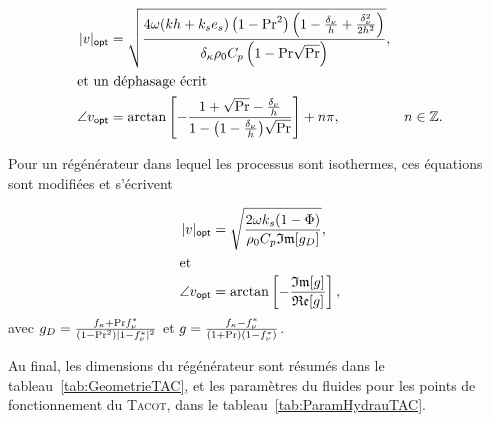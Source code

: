 \begin{subequations}
	\begin{align}
		|v|_{\sf opt} &= \sqrt{\frac{4 \omega (kh+k_se_s) \left(1-\mathrm{Pr}^2\right)\left(1-\frac{\delta_\nu}{h}+\frac{\delta_\nu^2}{2h^2}\right)}{\delta_\kappa \rho_0 C_p \left(1-\mathrm{Pr}\sqrt{\mathrm{Pr}}\right)}}, & 	\label{eq:u_mag_opt_Gaelle}\\
		\intertext{et un déphasage écrit}
		\angle v_{\sf opt} &= \arctan\left[-\frac{1+\sqrt{\mathrm{Pr}}-\frac{\delta_\nu}{h}}{1-\big(1-\frac{\delta_\nu}{h} \big)\sqrt{\mathrm{Pr}}}\right]+n \pi, & n \in \mathbb{Z}.	\label{eq:u_arg_opt_Gaelle}
	\end{align}
	\label{eq:u_opt_Gaelle}
\end{subequations}

Pour un régénérateur dans lequel les processus sont isothermes, ces équations sont modifiées et s'écrivent 

\begin{subequations}
	\begin{align}
		|v|_{\sf opt} &= \sqrt{\frac{2 \omega k_s(1-\Phi)}{\rho_0 C_p \mathfrak{Im}[g_D]}},\label{eq:u_mag_opt_reg_Gaelle} \\
		\intertext{et}
		\angle v_{\sf opt} &= \arctan\left[-\frac{\mathfrak{Im}[g]}{\mathfrak{Re}[g]}\right],
	\end{align}
\end{subequations}
avec $g_D = \frac{f_\kappa + \mathrm{Pr} f_\nu^*}{(1-\mathrm{Pr}^2)|1-f_\nu^*|^2}$ et $g = \frac{f_\kappa-f_\nu^*}{(1+\mathrm{Pr})(1-f_\nu^*)}$.


Au final, les dimensions du régénérateur sont résumés dans le tableau~\ref{tab:GeometrieTAC}, et les paramètres du fluides pour les points de fonctionnement du \textsc{Tacot}, dans le tableau~\ref{tab:ParamHydrauTAC}.

